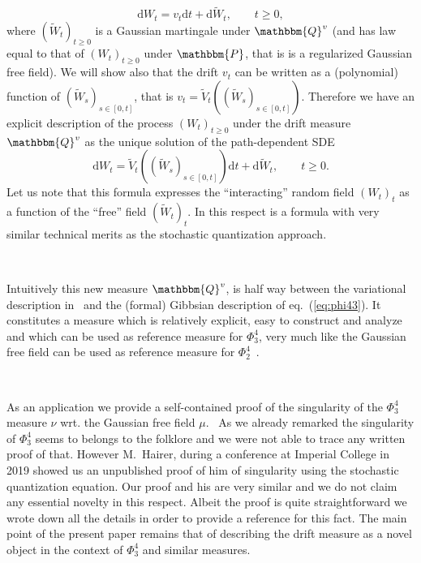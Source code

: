\documentclass[11pt]{article}
\newcommand{\mathd}{\mathrm{d}}
\begin{document}
\[ \mathd W_t = v_t \mathd t + \mathd \tilde{W}_t, \qquad t \geqslant 0, \]
where $(\tilde{W}_t)_{t \geqslant 0}$ is a Gaussian martingale under
$\mathbbm{Q}^v$ (and has law equal to that of $(W_t)_{t \geqslant 0}$ under
$\mathbbm{P}$, that is is a regularized Gaussian free field). We will show
also that the drift $v_t$ can be written as a (polynomial) function of
$(\tilde{W}_s)_{s \in [0, t]}$, that is $v_t = \tilde{V}_t ((\tilde{W}_s)_{s
\in [0, t]})$. Therefore we have an explicit description of the process
$(W_t)_{t \geqslant 0}$ under the drift measure $\mathbbm{Q}^v$ as the unique
solution of the path-dependent SDE
\begin{equation}
  \mathd W_t = \tilde{V}_t ((\tilde{W}_s)_{s \in [0, t]}) \mathd t + \mathd
  \tilde{W}_t, \qquad t \geqslant 0. \label{eq:sde-girs}
\end{equation}
Let us note that this formula expresses the ``interacting'' random field
$(W_t)_t$ as a function of the ``free'' field $(\tilde{W}_t)_t$. In this
respect is a formula with very similar technical merits as the stochastic
quantization approach.

\

Intuitively this new measure $\mathbbm{Q}^v$, is half way between the
variational description in~{\cite{barashkov_gubinelli_variational}} and the
(formal) Gibbsian description of eq.~(\ref{eq:phi43}). It constitutes a
measure which is relatively explicit, easy to construct and analyze and which
can be used as reference measure for $\Phi^4_3$, very much like the Gaussian
free field can be used as reference measure for
$\Phi^4_2$~{\cite{glimm_quantum_1987}}.

\

As an application we provide a self-contained proof of the singularity of the
$\Phi^4_3$ measure $\nu$ wrt. the Gaussian free field $\mu$. \ As we already
remarked the singularity of $\Phi^4_3$ seems to belongs to the folklore and we
were not able to trace any written proof of that. However M.~Hairer, during a
conference at Imperial College in 2019 showed us an unpublished proof of him
of singularity using the stochastic quantization equation. Our proof and his
are very similar and we do not claim any essential novelty in this respect.
Albeit the proof is quite straightforward we wrote down all the details in
order to provide a reference for this fact. The main point of the present
paper remains that of describing the drift measure as a novel object in the
context of $\Phi^4_3$ and similar measures.

\
\end{document}
